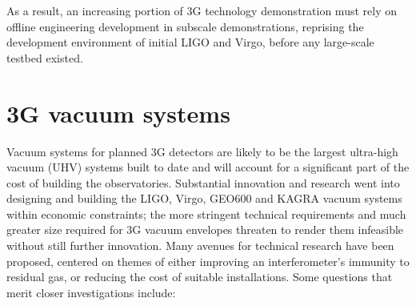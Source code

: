 As a result, an increasing portion of 3G technology demonstration must rely on offline engineering development in subscale demonstrations, reprising the  development environment of initial LIGO and Virgo, before any large-scale testbed existed. 

\section{3G vacuum systems}
Vacuum systems for planned 3G detectors are likely to be the largest ultra-high vacuum (UHV) systems built to date and will account for a significant part of the cost of building the observatories. Substantial innovation and research went into designing and building the LIGO, Virgo, GEO600 and KAGRA vacuum systems within economic constraints; the more stringent technical requirements and much greater size required for 3G vacuum envelopes threaten to render them infeasible without still further innovation. Many avenues for technical research have been proposed,  centered on themes of either improving an interferometer’s immunity to residual gas, or reducing the cost of suitable installations. Some questions that merit closer investigations include:

